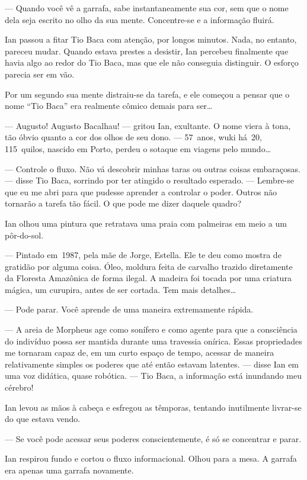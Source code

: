 --- Quando você vê a garrafa, sabe instantaneamente sua cor, sem que o
nome dela seja escrito no olho da sua mente. Concentre-se e a informação
fluirá.

Ian passou a fitar Tio Baca com atenção, por longos minutos. Nada, no
entanto, pareceu mudar. Quando estava prestes a desistir, Ian percebeu
finalmente que havia algo ao redor do Tio Baca, mas que ele não
conseguia distinguir. O esforço parecia ser em vão.

Por um segundo sua mente distraiu-se da tarefa, e ele começou a pensar
que o nome “Tio Baca” era realmente cômico demais para ser\ldots

--- Augusto! Augusto Bacalhau! --- gritou Ian, exultante. O nome viera à
tona, tão óbvio quanto a cor dos olhos de seu dono. --- 57~anos, wuki
há~20, 115~quilos, nascido em Porto, perdeu o sotaque em viagens pelo
mundo\ldots

--- Controle o fluxo. Não vá descobrir minhas taras ou outras coisas
embaraçosas. --- disse Tio Baca, sorrindo por ter atingido o resultado
esperado. --- Lembre-se que eu me abri para que pudesse aprender a
controlar o poder. Outros não tornarão a tarefa tão fácil. O que pode me
dizer daquele quadro?

Ian olhou uma pintura que retratava uma praia com palmeiras em meio a um
pôr-do-sol.

--- Pintado em~1987, pela mãe de Jorge, Estella. Ele te deu como mostra
de gratidão por alguma coisa. Óleo, moldura feita de carvalho trazido
diretamente da Floresta Amazônica de forma ilegal. A madeira foi tocada
por uma criatura mágica, um curupira, antes de ser cortada. Tem mais
detalhes\ldots

--- Pode parar. Você aprende de uma maneira extremamente rápida.

--- A areia de Morpheus age como sonífero e como agente para que a
consciência do indivíduo possa ser mantida durante uma travessia
onírica. Essas propriedades me tornaram capaz de, em um curto espaço de
tempo, acessar de maneira relativamente simples os poderes que até então
estavam latentes. --- disse Ian em uma voz didática, quase robótica. ---
Tio Baca, a informação está inundando meu cérebro!

Ian levou as mãos à cabeça e esfregou as têmporas, tentando inutilmente
livrar-se do que estava vendo.

--- Se você pode acessar seus poderes conscientemente, é só se
concentrar e parar.

Ian respirou fundo e cortou o fluxo informacional. Olhou para a mesa. A
garrafa era apenas uma garrafa novamente.

